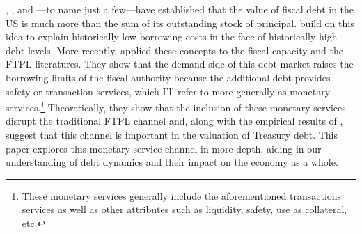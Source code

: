\documentclass[11pt,a4paper,margin=1.5in]{article}
\begin{document}
\citet{Krishnamurthy-VissingJorgensen:2012}, \citet{Krishnamurthy-VissingJorgensen:2013}, and \citet{Nagel:2016}---to name just a few---have established that the value of fiscal debt in the US is much more than the sum of its outstanding stock of principal. 
\citet*{Caballero-Farhi-Gourinchas:2017} build on this idea to explain historically low borrowing costs in the face of historically high debt levels.
More recently, \citet*{Brunnermeier-Merkel-Sannikov:2022} applied these concepts to the fiscal capacity and the FTPL literatures. 
They show that the demand side of this debt market raises the borrowing limits of the fiscal authority because the additional debt provides safety or transaction services, which I'll refer to more generally as monetary services.\footnote{
	These monetary services generally include the aforementioned transactions services as well as other attributes such as liquidity, safety, use as collateral, etc.}
Theoretically, they show that the inclusion of these monetary services disrupt the traditional FTPL channel \citep[see][as a seminal example]{Leeper:1991} and, along with the empirical results of \citet{Jiang-etal:2019}, suggest that this channel is important in the valuation of Treasury debt. 
This paper explores this monetary service channel in more depth, aiding in our understanding of debt dynamics and their impact on the economy as a whole. 
\end{document}
